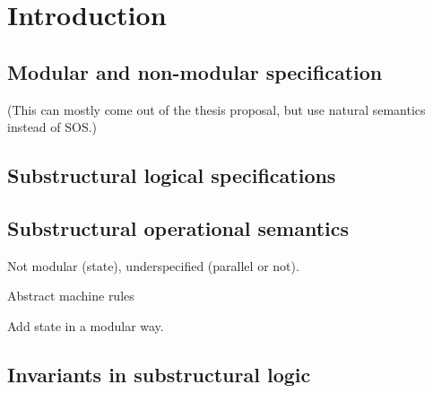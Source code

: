 \chapter{Introduction}

\section{Modular and non-modular specification}
\label{sec:modularnonmodular}

(This can mostly come out of the thesis proposal, but use 
natural semantics instead of SOS.)

\section{Substructural logical specifications}



\section{Substructural operational semantics}
\label{sec:intro-ssos}


Not modular (state), underspecified (parallel or not).

Abstract machine rules

Add state in a modular way.

\section{Invariants in substructural logic}
